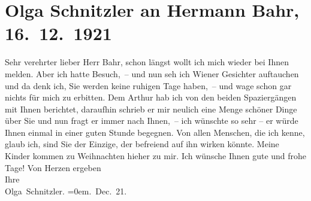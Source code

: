 

         
         \renewcommand{\erwaehntePersonen}{Personen: Hermann Bahr, Lili Schnitzler, Heinrich Schnitzler}
         \renewcommand{\erwaehnteOrte}{Orte: Salzburg, Wien}
         \renewcommand{\erwaehnteWerke}{}
               \section[Olga Schnitzler an Hermann Bahr, 16. 12. 1921]{ Olga Schnitzler an Hermann Bahr, 16. 12. 1921}\nopagebreak{}\rehead{ }\begin{ledgroupsized}[t]{13cm}\normalsize\beginnumbering \toendnotes[C]{\smallbreak\pagebreak[2]} 
\toendnotes[C]{\smallbreak}\pstart{}{\pb}Sehr verehrter lieber Herr Bahr,\pend\pstart
           schon längst wollt ich mich wieder bei Ihnen melden. Aber ich hatte Besuch, –
               und nun seh ich Wiener Gesichter auftauchen und da
               denk ich, Sie werden keine ruhigen Tage haben, – und wage schon gar nichts für
               mich zu erbitten.\pend
           \pstart
           Dem Arthur hab ich von den beiden Spaziergängen
               mit Ihnen berichtet, daraufhin schrieb er mir neulich eine Menge schöner Dinge über
               Sie und nun fragt er immer nach Ihnen, – ich wünschte so sehr – er würde Ihnen
               einmal in einer guten Stunde begegnen. Von allen Menschen, die ich kenne, glaub ich,
               sind Sie der Einzige, der befreiend auf ihn wirken könnte.\pend
           \pstart
           Meine Kinder kommen zu
               Weihnachten hieher zu mir.\pend
           \pstart
           {\pb}Ich wünsche Ihnen gute und frohe Tage! \pend
           \pstart
           Von Herzen ergeben{\\[\baselineskip]}Ihre{\\[\baselineskip]}\spacefill\mbox{Olga Schnitzler.}\pend
           \leftskip=0em{}. Dec. 21.\pend
           

\end{ledgroupsized}
